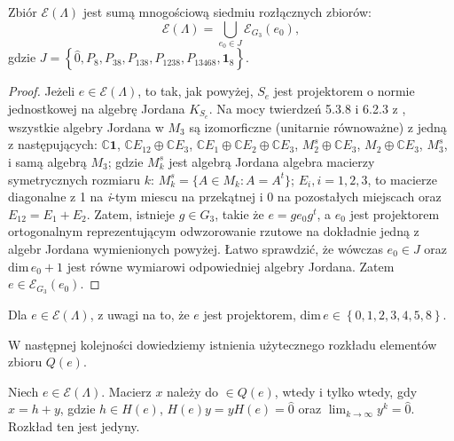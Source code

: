 \begin{Theorem}
\label{thm:Idempotents}
Zbiór $\mathcal{E}(\Lambda)$
jest sumą mnogościową siedmiu rozłącznych zbiorów:
    \begin{equation}
        \mathcal{E}(\Lambda) = \bigcup \limits_{e_{0} \in J} \mathcal{E}_{G_{3}}(e_{0}),
    \end{equation}
    gdzie $J = \left \{ \hat{0}, P_{8}, P_{38}, P_{138}, P_{1238}, P_{13468}, \mathbf{1}_{8} \right \}$.
\end{Theorem}
\begin{proof}
Jeżeli $e \in \mathcal{E}(\Lambda)$, to tak, jak powyżej, $S_{e}$
jest projektorem o normie jednostkowej na algebrę Jordana $K_{S_{e}}$.
Na mocy twierdzeń 5.3.8 i 6.2.3 z \cite{Hanche1984},
wszystkie algebry Jordana w $M_{3}$ są izomorficzne (unitarnie równoważne) z
jedną z następujących:
    $\mathbb{C}\mathbf{1}$,
    $\mathbb{C} E_{12} \oplus \mathbb{C} E_{3}$,
    $\mathbb{C} E_{1} \oplus \mathbb{C} E_{2} \oplus \mathbb{C} E_{3}$,
    $M_{2}^{s} \oplus \mathbb{C} E_{3}$,
    $M_{2} \oplus \mathbb{C} E_{3}$,
    $M_{3}^{s}$,
    i
    samą algebrą $M_{3}$;
gdzie $M_{k}^{s}$ jest algebrą Jordana algebra macierzy symetrycznych rozmiaru
$k$: $M_{k}^{s} = \{ A \in M_{k}: A = A^{t} \}$;
    $E_{i}, i = 1,2,3$, to macierze diagonalne z 1 na \emph{i}-tym miescu na
    przekątnej i 0 na pozostałych miejscach oraz $E_{12} = E_{1} + E_{2}$.
Zatem, istnieje $g \in G_{3}$, takie że
    $e = g e_{0} g ^{t}$, a $e_{0}$ jest projektorem ortogonalnym
    reprezentującym odwzorowanie rzutowe na dokładnie jedną z algebr Jordana
    wymienionych powyżej.
Łatwo sprawdzić, że wówczas $e_{0} \in J$ oraz
$\text{dim} \, e_{0} + 1$ jest równe wymiarowi odpowiedniej algebry Jordana.
Zatem $e \in \mathcal{E}_{G_{3}}(e_{0})$.
\end{proof}

\begin{Corollary}
\label{cor:q}
    Dla $e \in \mathcal{E}(\Lambda)$, z uwagi na to, że $e$ jest projektorem,
    $\text{dim} \, e
    \in \left \{ 0,1,2,3,4,5,8 \right \}$.
\end{Corollary}

W następnej kolejności dowiedziemy istnienia użytecznego rozkładu elementów
zbioru $Q(e)$.

\begin{Lemma}
\label{lem:decomposition}
    Niech $e \in \mathcal{E}(\Lambda)$.
    Macierz $x$ należy do $\in Q(e)$, wtedy i tylko wtedy, gdy
    $x = h + y$, gdzie
    $h \in H(e)$, $H(e) y = y H(e) = \hat{0}$ oraz
    $\lim_{k \rightarrow \infty} y^{k} = \hat{0}$.
    Rozkład ten jest jedyny.
\end{Lemma}

